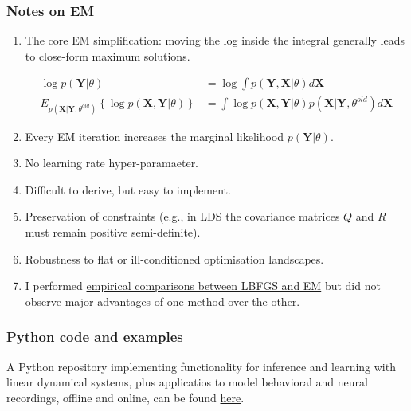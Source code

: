 \begin{frame}
    \frametitle{Notes on EM}

    \footnotesize
    \begin{enumerate}

        \item The core EM simplification: moving the log inside the integral
            generally leads to close-form maximum solutions.

            \begin{align*}
                \log p(\mathbf{Y}|\theta)&=\log\int p(\mathbf{Y},\mathbf{X}|\theta)d\mathbf{X}\\
                E_{p(\mathbf{X}|\mathbf{Y},\theta^{old})}\left\{\log p(\mathbf{X},\mathbf{Y}|\theta)\right\}&=\int\log p(\mathbf{X},\mathbf{Y}|\theta)p(\mathbf{X}|\mathbf{Y},\theta^{old})d\mathbf{X}
            \end{align*}

        \item Every EM iteration increases the marginal likelihood
            $p(\mathbf{Y}|\theta)$.

        \item No learning rate hyper-paramaeter.

        \item Difficult to derive, but easy to implement.

        \item Preservation of constraints (e.g., in LDS the covariance matrices
            $Q$ and $R$ must remain positive semi-definite).

        \item Robustness to flat or ill-conditioned optimisation landscapes.

        \item I performed \href{https://joacorapela.github.io/ssm/auto\_examples/index.html\#kinematics-inference}{empirical comparisons between LBFGS and EM} but did not observe major advantages of one method over the other.


    \end{enumerate}
    \normalsize

\end{frame}

\begin{frame}
    \frametitle{Python code and examples}

	A Python repository implementing functionality for inference and learning
	with linear dynamical systems, plus applicatios to model behavioral and
	neural recordings, offline and online, can be found
	\href{https://github.com/joacorapela/ssm}{here}.

\end{frame}

